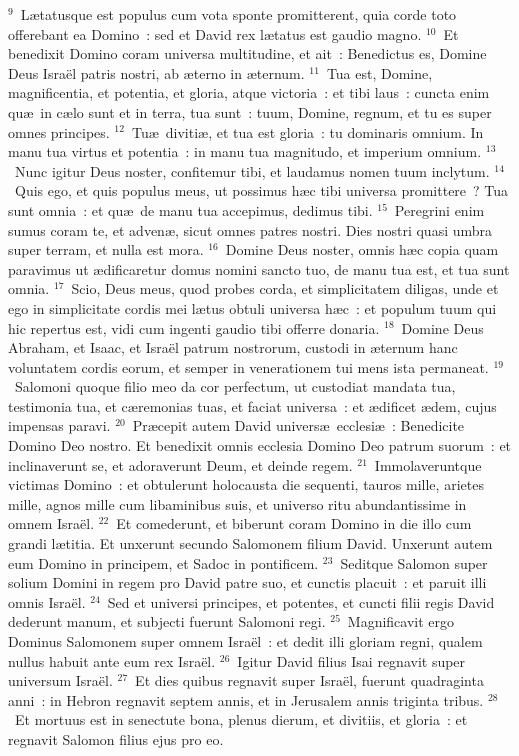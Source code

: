 ${}^{9}$~L\ae tatusque est populus cum vota sponte promitterent, quia corde toto offerebant ea Domino~: sed et David rex l\ae tatus est gaudio magno.
${}^{10}$~Et benedixit Domino coram universa multitudine, et ait~: Benedictus es, Domine Deus Isra\"el patris nostri, ab \ae terno in \ae ternum.
${}^{11}$~Tua est, Domine, magnificentia, et potentia, et gloria, atque victoria~: et tibi laus~: cuncta enim qu\ae\ in c\ae lo sunt et in terra, tua sunt~: tuum, Domine, regnum, et tu es super omnes principes.
${}^{12}$~Tu\ae\ diviti\ae , et tua est gloria~: tu dominaris omnium. In manu tua virtus et potentia~: in manu tua magnitudo, et imperium omnium.
${}^{13}$~Nunc igitur Deus noster, confitemur tibi, et laudamus nomen tuum inclytum.
${}^{14}$~Quis ego, et quis populus meus, ut possimus h\ae c tibi universa promittere~? Tua sunt omnia~: et qu\ae\ de manu tua accepimus, dedimus tibi.
${}^{15}$~Peregrini enim sumus coram te, et adven\ae , sicut omnes patres nostri. Dies nostri quasi umbra super terram, et nulla est mora.
${}^{16}$~Domine Deus noster, omnis h\ae c copia quam paravimus ut \ae dificaretur domus nomini sancto tuo, de manu tua est, et tua sunt omnia.
${}^{17}$~Scio, Deus meus, quod probes corda, et simplicitatem diligas, unde et ego in simplicitate cordis mei l\ae tus obtuli universa h\ae c~: et populum tuum qui hic repertus est, vidi cum ingenti gaudio tibi offerre donaria.
${}^{18}$~Domine Deus Abraham, et Isaac, et Isra\"el patrum nostrorum, custodi in \ae ternum hanc voluntatem cordis eorum, et semper in venerationem tui mens ista permaneat.
${}^{19}$~Salomoni quoque filio meo da cor perfectum, ut custodiat mandata tua, testimonia tua, et c\ae remonias tuas, et faciat universa~: et \ae dificet \ae dem, cujus impensas paravi.
${}^{20}$~Pr\ae cepit autem David univers\ae\ ecclesi\ae~: Benedicite Domino Deo nostro. Et benedixit omnis ecclesia Domino Deo patrum suorum~: et inclinaverunt se, et adoraverunt Deum, et deinde regem.
${}^{21}$~Immolaveruntque victimas Domino~: et obtulerunt holocausta die sequenti, tauros mille, arietes mille, agnos mille cum libaminibus suis, et universo ritu abundantissime in omnem Isra\"el.
${}^{22}$~Et comederunt, et biberunt coram Domino in die illo cum grandi l\ae titia. Et unxerunt secundo Salomonem filium David. Unxerunt autem eum Domino in principem, et Sadoc in pontificem.
${}^{23}$~Seditque Salomon super solium Domini in regem pro David patre suo, et cunctis placuit~: et paruit illi omnis Isra\"el.
${}^{24}$~Sed et universi principes, et potentes, et cuncti filii regis David dederunt manum, et subjecti fuerunt Salomoni regi.
${}^{25}$~Magnificavit ergo Dominus Salomonem super omnem Isra\"el~: et dedit illi gloriam regni, qualem nullus habuit ante eum rex Isra\"el.
${}^{26}$~Igitur David filius Isai regnavit super universum Isra\"el.
${}^{27}$~Et dies quibus regnavit super Isra\"el, fuerunt quadraginta anni~: in Hebron regnavit septem annis, et in Jerusalem annis triginta tribus.
${}^{28}$~Et mortuus est in senectute bona, plenus dierum, et divitiis, et gloria~: et regnavit Salomon filius ejus pro eo.



